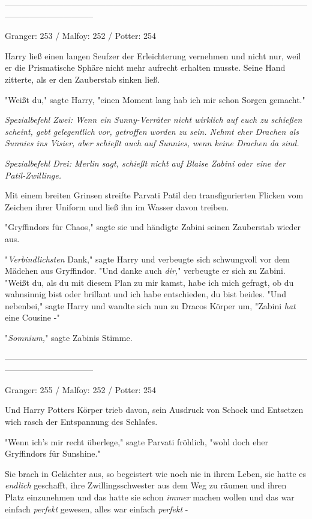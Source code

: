 {--------------------------------------------------------------------------------------------------------------------------------------------

Granger: 253 / Malfoy: 252 / Potter: 254

Harry ließ einen langen Seufzer der Erleichterung vernehmen und nicht nur, weil er die Prismatische Sphäre nicht mehr aufrecht erhalten musste. Seine Hand zitterte, als er den Zauberstab sinken ließ.

"Weißt du," sagte Harry, "einen Moment lang hab ich mir schon Sorgen gemacht."

\emph{Spezialbefehl Zwei: Wenn ein Sunny-Verräter nicht wirklich auf euch zu schießen scheint, gebt gelegentlich vor, getroffen worden zu sein. Nehmt eher Drachen als Sunnies ins Visier, aber schießt auch auf Sunnies, wenn keine Drachen da sind.}

\emph{Spezialbefehl Drei: Merlin sagt, schießt nicht auf Blaise Zabini oder eine der Patil-Zwillinge.}

Mit einem breiten Grinsen streifte Parvati Patil den transfigurierten Flicken vom Zeichen ihrer Uniform und ließ ihn im Wasser davon treiben.

"Gryffindors für Chaos," sagte sie und händigte Zabini seinen Zauberstab wieder aus.

"\emph{Verbindlichsten} Dank," sagte Harry und verbeugte sich schwungvoll vor dem Mädchen aus Gryffindor. "Und danke auch \emph{dir,}" verbeugte er sich zu Zabini. "Weißt du, als du mit diesem Plan zu mir kamst, habe ich mich gefragt, ob du wahnsinnig bist oder brillant und ich habe entschieden, du bist beides. "Und nebenbei," sagte Harry und wandte sich nun zu Dracos Körper um, "Zabini \emph{hat} eine Cousine -"

"\emph{Somnium,}" sagte Zabinis Stimme.

--------------------------------------------------------------------------------------------------------------------------------------------

Granger: 255 / Malfoy: 252 / Potter: 254

Und Harry Potters Körper trieb davon, sein Ausdruck von Schock und Entsetzen wich rasch der Entspannung des Schlafes.

"Wenn ich's mir recht überlege," sagte Parvati fröhlich, "wohl doch eher Gryffindors für Sunshine."

Sie brach in Gelächter aus, so begeistert wie noch nie in ihrem Leben, sie hatte es \emph{endlich} geschafft, ihre Zwillingsschwester aus dem Weg zu räumen und ihren Platz einzunehmen und das hatte sie schon \emph{immer} machen wollen und das war einfach \emph{perfekt} gewesen, alles war einfach \emph{perfekt} -

}
